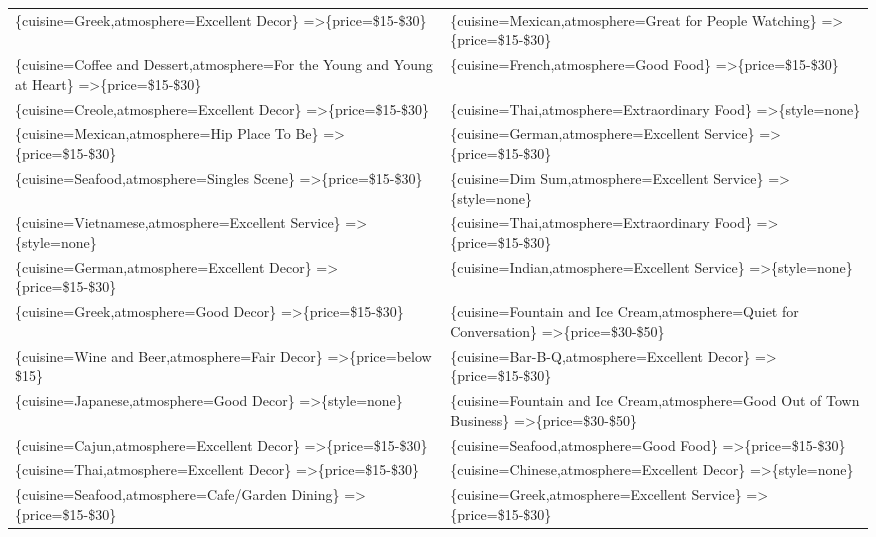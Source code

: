 \documentclass[letterpaper,10pt]{article}
\begin{document}
\begin{appendices}
\begin{table}[h]
\begin{adjustbox}{max width=\textwidth}
\begin{tabular}{ll}
\{cuisine=Greek,atmosphere=Excellent Decor\} =\textgreater \{price=\$15-\$30\} & \{cuisine=Mexican,atmosphere=Great for People Watching\} =\textgreater \{price=\$15-\$30\} \\
\{cuisine=Coffee and Dessert,atmosphere=For the Young and Young at Heart\} =\textgreater \{price=\$15-\$30\} & \{cuisine=French,atmosphere=Good Food\} =\textgreater \{price=\$15-\$30\} \\
\{cuisine=Creole,atmosphere=Excellent Decor\} =\textgreater \{price=\$15-\$30\} & \{cuisine=Thai,atmosphere=Extraordinary Food\} =\textgreater \{style=none\} \\
\{cuisine=Mexican,atmosphere=Hip Place To Be\} =\textgreater \{price=\$15-\$30\} & \{cuisine=German,atmosphere=Excellent Service\} =\textgreater \{price=\$15-\$30\} \\
\{cuisine=Seafood,atmosphere=Singles Scene\} =\textgreater \{price=\$15-\$30\} & \{cuisine=Dim Sum,atmosphere=Excellent Service\} =\textgreater \{style=none\} \\
\{cuisine=Vietnamese,atmosphere=Excellent Service\} =\textgreater \{style=none\} & \{cuisine=Thai,atmosphere=Extraordinary Food\} =\textgreater \{price=\$15-\$30\} \\
\{cuisine=German,atmosphere=Excellent Decor\} =\textgreater \{price=\$15-\$30\} & \{cuisine=Indian,atmosphere=Excellent Service\} =\textgreater \{style=none\} \\
\{cuisine=Greek,atmosphere=Good Decor\} =\textgreater \{price=\$15-\$30\} & \{cuisine=Fountain and Ice Cream,atmosphere=Quiet for Conversation\} =\textgreater \{price=\$30-\$50\} \\
\{cuisine=Wine and Beer,atmosphere=Fair Decor\} =\textgreater \{price=below \$15\} & \{cuisine=Bar-B-Q,atmosphere=Excellent Decor\} =\textgreater \{price=\$15-\$30\} \\
\{cuisine=Japanese,atmosphere=Good Decor\} =\textgreater \{style=none\} & \{cuisine=Fountain and Ice Cream,atmosphere=Good Out of Town Business\} =\textgreater \{price=\$30-\$50\} \\
\{cuisine=Cajun,atmosphere=Excellent Decor\} =\textgreater \{price=\$15-\$30\} & \{cuisine=Seafood,atmosphere=Good Food\} =\textgreater \{price=\$15-\$30\} \\
\{cuisine=Thai,atmosphere=Excellent Decor\} =\textgreater \{price=\$15-\$30\} & \{cuisine=Chinese,atmosphere=Excellent Decor\} =\textgreater \{style=none\} \\
\{cuisine=Seafood,atmosphere=Cafe/Garden Dining\} =\textgreater \{price=\$15-\$30\} & \{cuisine=Greek,atmosphere=Excellent Service\} =\textgreater \{price=\$15-\$30\} \\

\end{tabular}
\end{adjustbox}
\end{table}
\end{appendices}
\end{document}
